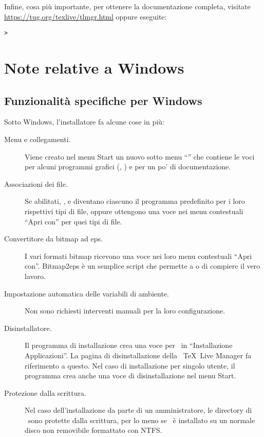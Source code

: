 \documentclass{article}
\begin{document}
Infine, cosa più importante, per ottenere la documentazione completa,
visitate \url{https://tug.org/texlive/tlmgr.html} oppure eseguite:
\begin{alltt}
> 
\end{alltt}


\section{Note relative a Windows}
\label{sec:windows}


\subsection{Funzionalità specifiche per Windows}
\label{sec:winfeatures}

Sotto Windows, l'installatore fa alcune cose in più:
\begin{description}
\item[Menu e collegamenti.] Viene creato nel menu Start un nuovo sotto
  menu ``\TL'' che contiene le voci per alcuni programmi grafici
  (, ) e per un po' di documentazione. 
\item[Associazioni dei file.] Se abilitati, ,  e
   diventano ciascuno il programma predefinito per i loro
  rispettivi tipi di file, oppure ottengono una voce nei menu contestuali
  ``Apri con'' per quei tipi di file.
\item[Convertitore da bitmap ad eps.] I vari formati bitmap ricevono una
  voce  nei loro menu contestuali ``Apri con''.
  Bitmap2eps è un semplice script che permette a  o
   di compiere il vero lavoro.
\item[Impostazione automatica delle variabili di ambiente.] Non sono
  richiesti interventi manuali per la loro configurazione.
\item[Disinstallatore.] Il programma di installazione crea una voce per
  \TL\ in ``Installazione Applicazioni''. La pagina di disinstallazione
  della \GUI\ \TeX\ Live Manager fa riferimento a questo. Nel caso di
  installazione per singolo utente, il programma crea anche una voce di
  disinstallazione nel menu Start.
\item[Protezione dalla scrittura.] Nel caso dell'installazione da parte
  di un amministratore, le directory di \TL\ sono protette dalla
  scrittura, per lo meno se \TL\ è installato su un normale disco non
  removibile formattato con NTFS.
\end{description}
\end{document}
